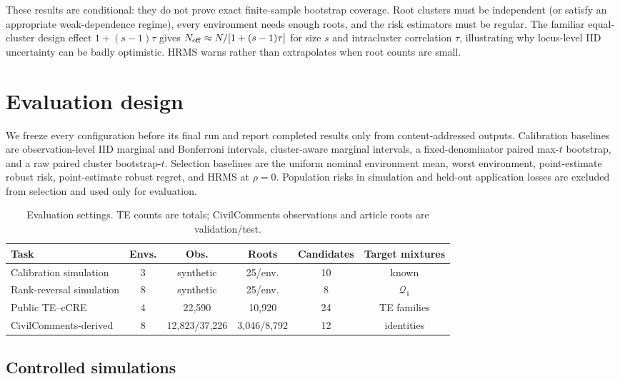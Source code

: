 \documentclass{article}
\newcommand{\Q}{\mathcal{Q}}
\newcommand{\CivilObservations}{12,823/37,226}
\newcommand{\CivilRoots}{3,046/8,792}
\newcommand{\CivilCandidates}{12}
\begin{document}
These results are conditional: they do not prove exact finite-sample bootstrap coverage.  Root clusters must be independent (or satisfy an appropriate weak-dependence regime), every environment needs enough roots, and the risk estimators must be regular.  The familiar equal-cluster design effect $1+(s-1)\tau$ gives $N_{\rm eff}\approx N/[1+(s-1)\tau]$ for size $s$ and intracluster correlation $\tau$, illustrating why locus-level IID uncertainty can be badly optimistic.  HRMS warns rather than extrapolates when root counts are small.

\section{Evaluation design}
\label{sec:experiments}

We freeze every configuration before its final run and report completed results only from content-addressed outputs.  Calibration baselines are observation-level IID marginal and Bonferroni intervals, cluster-aware marginal intervals, a fixed-denominator paired max-$t$ bootstrap, and a raw paired cluster bootstrap-$t$.  Selection baselines are the uniform nominal environment mean, worst environment, point-estimate robust risk, point-estimate robust regret, and HRMS at $\rho=0$.  Population risks in simulation and held-out application losses are excluded from selection and used only for evaluation.

\begin{table}[t]
\centering
\caption{Evaluation settings.  TE counts are totals; CivilComments observations and article roots are validation/test.}
\label{tab:data}
\scriptsize
\setlength{\tabcolsep}{3pt}
\begin{tabular}{lccccc}
\toprule
Task & Envs. & Obs. & Roots & Candidates & Target mixtures \\
\midrule
Calibration simulation & 3 & synthetic & 25/env. & 10 & known \\
Rank-reversal simulation & 8 & synthetic & 25/env. & 8 & $\Q_{1}$ \\
Public TE--cCRE & 4 & 22,590 & 10,920 & 24 & TE families \\
CivilComments-derived & 8 & \CivilObservations & \CivilRoots & \CivilCandidates & identities \\
\bottomrule
\end{tabular}
\end{table}

\subsection{Controlled simulations}
\end{document}
